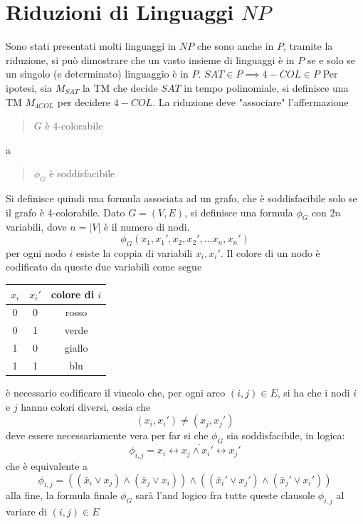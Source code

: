 \documentclass[10pt, letterpaper]{report}
\begin{document}
\section{Riduzioni di Linguaggi $NP$}
Sono stati presentati molti linguaggi in $NP$ che sono anche in $P$, tramite la riduzione, si può dimostrare che un vasto insieme di linguaggi è in $P$ se e solo se un singolo (e determinato) linguaggio è in $P$.\acc 
\teo{} $SAT\in P \implies 4-COL\in P$\acc 
\dimo{} Per ipotesi, sia $M_{SAT}$ la TM che decide $SAT$ in tempo polinomiale, si definisce una TM $M_{4COL}$ per decidere $4-COL$. La riduzione deve "associare" l'affermazione \begin{quote}
    $G$ è 4-colorabile
\end{quote}
a \begin{quote}
    $\phi_G$ è soddisfacibile 
\end{quote}
Si definisce quindi una formula associata ad un grafo, che è soddisfacibile solo se il grafo è 4-colorabile.\acc 
Dato $G=(V,E)$, si definisce una formula $\phi_G$ con $2n$ variabili, dove $n=|V|$ è il numero di nodi. 
$$ \phi_G(x_1,x_1',x_2,x_2',\dots x_n,x_n')$$
per ogni nodo $i$ esiste la coppia di variabili $x_i,x_i'$. Il colore di un nodo è codificato da queste due variabili come segue \begin{center}
    \begin{tabular}{|c|c|c|}
        \hline
        $x_i$ & $x_i'$ & colore di $i$                 \\ \hline
        0     & 0      & {\color[HTML]{9A0000} rosso}  \\ \hline
        0     & 1      & {\color[HTML]{036400} verde}  \\ \hline
        1     & 0      & {\color[HTML]{C69A00} giallo} \\ \hline
        1     & 1      & {\color[HTML]{3531FF} blu}    \\ \hline
        \end{tabular}
\end{center}
è necessario codificare il vincolo che, per ogni arco $(i,j)\in E$, si ha che i nodi $i$ e $j$ hanno colori diversi, ossia che $$ (x_i,x_i')\ne (x_j,x_j')$$ deve essere necessariamente vera per far si che $\phi_G$ sia soddisfacibile, in logica:
$$ \phi_{i,j}=\overline{ 
x_i\leftrightarrow x_j \land x_i'\leftrightarrow x_j'
}$$
che è equivalente a 
$$ 
\phi_{i,j}=((\bar x_i\lor x_j)\land (\bar x_j \lor x_i))\land  
((\bar x_i'\lor x_j')\land (\bar x_j' \lor x_i'))
$$
alla fine, la formula finale $\phi_G$ sarà l'and logico fra tutte queste clausole $\phi_{i,j}$ al variare di $(i,j)\in E$ 
\end{document}
